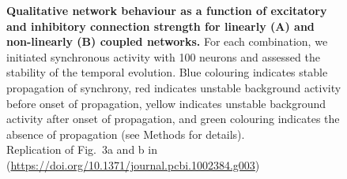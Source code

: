 \documentclass[10pt,a4paper,onecolumn]{article}
\begin{document}
\begin{figure}
\begin{subfigure}[t]{0.5\textwidth}
\end{subfigure}
\caption{\label{fig:grid}
\textbf{Qualitative network behaviour as a function of excitatory and inhibitory connection strength for linearly (A) and non-linearly (B) coupled networks.} For each combination, we initiated synchronous activity with 100 neurons and assessed the stability of the temporal evolution. Blue colouring indicates stable propagation of synchrony, red indicates unstable background activity before onset of propagation, yellow indicates unstable background activity after onset of propagation, and green colouring indicates the absence of propagation (see Methods for details).\\
Replication of Fig.~3a and b in \cite{Memmesheimer2012} (\url{https://doi.org/10.1371/journal.pcbi.1002384.g003})}
\end{figure}
\end{document}
